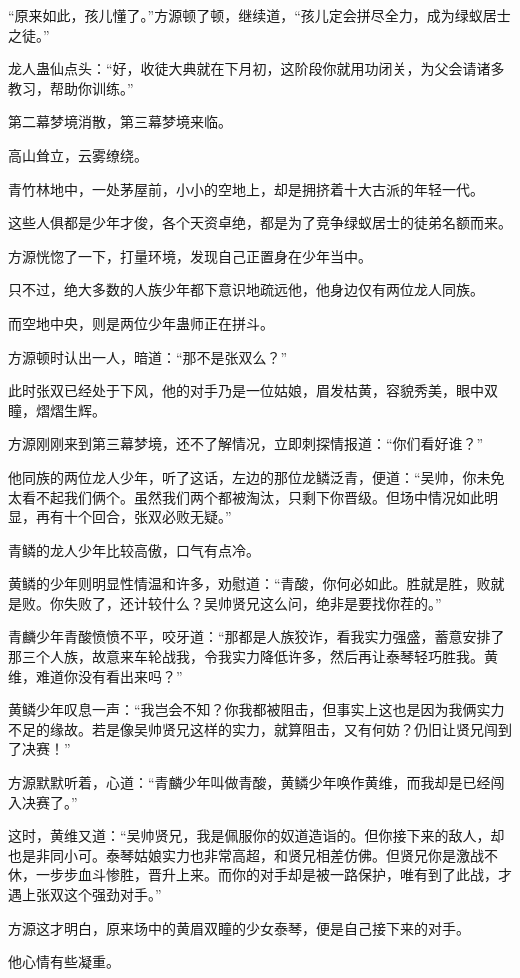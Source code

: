 \begin{this_body}
“原来如此，孩儿懂了。”方源顿了顿，继续道，“孩儿定会拼尽全力，成为绿蚁居士之徒。”

龙人蛊仙点头：“好，收徒大典就在下月初，这阶段你就用功闭关，为父会请诸多教习，帮助你训练。”

第二幕梦境消散，第三幕梦境来临。

高山耸立，云雾缭绕。

青竹林地中，一处茅屋前，小小的空地上，却是拥挤着十大古派的年轻一代。

这些人俱都是少年才俊，各个天资卓绝，都是为了竞争绿蚁居士的徒弟名额而来。

方源恍惚了一下，打量环境，发现自己正置身在少年当中。

只不过，绝大多数的人族少年都下意识地疏远他，他身边仅有两位龙人同族。

而空地中央，则是两位少年蛊师正在拼斗。

方源顿时认出一人，暗道：“那不是张双么？”

此时张双已经处于下风，他的对手乃是一位姑娘，眉发枯黄，容貌秀美，眼中双瞳，熠熠生辉。

方源刚刚来到第三幕梦境，还不了解情况，立即刺探情报道：“你们看好谁？”

他同族的两位龙人少年，听了这话，左边的那位龙鳞泛青，便道：“吴帅，你未免太看不起我们俩个。虽然我们两个都被淘汰，只剩下你晋级。但场中情况如此明显，再有十个回合，张双必败无疑。”

青鳞的龙人少年比较高傲，口气有点冷。

黄鳞的少年则明显性情温和许多，劝慰道：“青酸，你何必如此。胜就是胜，败就是败。你失败了，还计较什么？吴帅贤兄这么问，绝非是要找你茬的。”

青麟少年青酸愤愤不平，咬牙道：“那都是人族狡诈，看我实力强盛，蓄意安排了那三个人族，故意来车轮战我，令我实力降低许多，然后再让泰琴轻巧胜我。黄维，难道你没有看出来吗？”

黄鳞少年叹息一声：“我岂会不知？你我都被阻击，但事实上这也是因为我俩实力不足的缘故。若是像吴帅贤兄这样的实力，就算阻击，又有何妨？仍旧让贤兄闯到了决赛！”

方源默默听着，心道：“青麟少年叫做青酸，黄鳞少年唤作黄维，而我却是已经闯入决赛了。”

这时，黄维又道：“吴帅贤兄，我是佩服你的奴道造诣的。但你接下来的敌人，却也是非同小可。泰琴姑娘实力也非常高超，和贤兄相差仿佛。但贤兄你是激战不休，一步步血斗惨胜，晋升上来。而你的对手却是被一路保护，唯有到了此战，才遇上张双这个强劲对手。”

方源这才明白，原来场中的黄眉双瞳的少女泰琴，便是自己接下来的对手。

他心情有些凝重。


\end{this_body}

